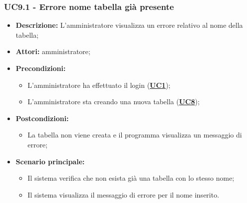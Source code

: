 \subsubsection{UC9.1 - Errore nome tabella già presente}
\label{sec:UC9.1}
\begin{itemize}
	\item \textbf{Descrizione:} L’amministratore visualizza un errore relativo al nome della tabella;
	\item \textbf{Attori:} amministratore;
	\item \textbf{Precondizioni:} 
	\begin{itemize}
		\item L’amministratore ha effettuato il login (\hyperref[sec:UC1]{\textbf{UC1}});
		\item L’amministratore sta creando una nuova tabella (\hyperref[sec:UC1]{\textbf{UC8}});
	\end{itemize}
	\item \textbf{Postcondizioni:} 
	\begin{itemize}
		\item La tabella non viene creata e il programma visualizza un messaggio di errore;
	\end{itemize}
	\item \textbf{Scenario principale:} 
	\begin{itemize}
		\item Il sistema verifica che non esista già una tabella con lo stesso nome;
		\item Il sistema visualizza il messaggio di errore per il nome inserito.
	\end{itemize}
\end{itemize}

